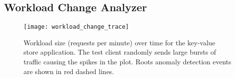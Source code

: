 

\subsection{Workload Change Analyzer}

\begin{figure}
\centering
\texttt{[image: workload\_change\_trace]}
\caption{Workload size (requests per minute) over time for the key-value store application. The test client randomly sends
large bursts of traffic causing the spikes in the plot. Roots anomaly detection events are shown
in red dashed lines.}
\vspace{-0.1in}
\label{fig:workload_change}
\end{figure}

